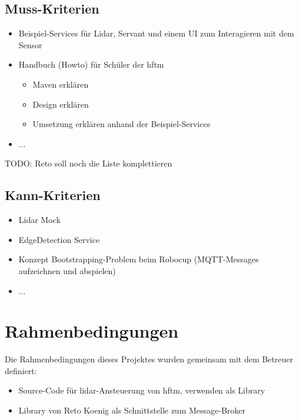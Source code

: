 \subsection{Muss-Kriterien}
\begin{itemize}
	\item Beispiel-Services für Lidar, Servant und einem UI zum Interagieren mit dem Sensor
	\item Handbuch (Howto) für Schüler der \acrshort{hftm}
	\begin{itemize}
		\item Maven erklären
		\item Design erklären
		\item Umsetzung erklären anhand der Beispiel-Services
	\end{itemize}
	\item ...
\end{itemize}

TODO:
Reto soll noch die Liste komplettieren
\subsection{Kann-Kriterien}
\begin{itemize}
	\item Lidar Mock
	\item EdgeDetection Service
	\item Konzept Bootstrapping-Problem beim Robocup (MQTT-Messages aufzeichnen und abspielen)
	\item ...
\end{itemize}

\section{Rahmenbedingungen}
Die Rahmenbedingungen dieses Projektes wurden gemeinsam mit dem Betreuer definiert:
\begin{itemize}
	\item Source-Code für \acrshort{lidar}-Ansteuerung von \acrshort{hftm}, verwenden als Library
	\item Library  \cite{ch.quantasy.mqtt.gateway} von Reto Koenig als Schnittstelle zum Message-Broker
\end{itemize}


